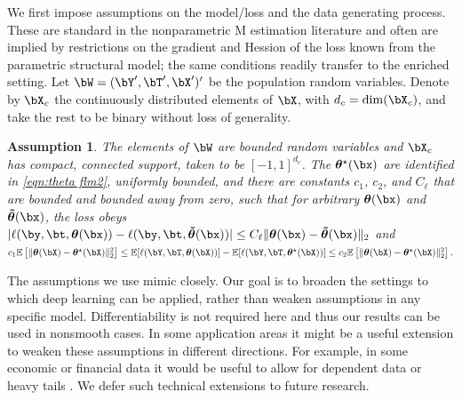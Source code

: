 \documentclass[12pt]{article}
\newtheorem{assumption}{Assumption}
\numberwithin{equation}{section}
\theoremstyle{definition}
\newcommand{\E}{\mathbb{E}}
\newcommand{\btheta}{\boldsymbol{\theta}}
\newcommand{\bttrue}{\btheta^\star}
\newcommand{\dc}{d_c}  %
\begin{document}
We first impose assumptions on the model/loss and the data generating process. These are standard in the nonparametric M estimation literature \cite{Chen2007_handbook} and often are implied by restrictions on the gradient and Hession of the loss known from the parametric structural model; the same conditions readily transfer to the enriched setting. Let $\bW = (\bY',\bT',\bX')'$ be the population random variables. Denote by $\bX_c$ the continuously distributed elements of $\bX$, with $\dc = \dim(\bX_c)$, and take the rest to be binary without loss of generality. 
\begin{assumption}
	\label{asmpt:dgp dnn}
    The elements of $\bW$ are bounded random variables and $\bX_c$ has compact, connected support, taken to be $[-1,1]^{\dc}$. The $\bttrue(\bx)$ are identified in \eqref{eqn:theta flm2}, uniformly bounded, and there are constants $c_1$, $c_2$, and $C_\ell$ that are bounded and bounded away from zero, such that for arbitrary $\btheta(\bx)$ and $\bm{\tilde{\theta}}(\bx)$, the loss obeys $|\ell(\by,\bt,\btheta(\bx) ) - \ell(\by,\bt,\bm{\tilde{\theta}}(\bx))| \leq C_\ell \|\btheta(\bx) - \bm{\tilde{\theta}}(\bx) \|_2$ and 
    $
        c_1 \E \left[ \|\btheta(\bX) - \bttrue (\bX) \|_2^2 \right] \leq \E [\ell(\bY,\bT,\btheta(\bX))] - \E [\ell(\bY,\bT,\bttrue(\bX))] \leq c_2 \E \left[ \|\btheta(\bX) - \bttrue (\bX) \|_2^2 \right].
    $
\end{assumption}
The assumptions we use mimic \cite{Farrell-Liang-Misra2021_Ecma} closely. Our goal is to broaden the settings to which deep learning can be applied, rather than weaken assumptions in any specific model. Differentiability is not required here and thus our results can be used in nonsmooth cases. In some application areas it might be a useful extension to weaken these assumptions in different directions. For example, in some economic or financial data it would be useful to allow for dependent data \cite{Brown2025_WP} or heavy tails \cite{Fan-Gu-Zhou2024_AoS}. We defer such technical extensions to future research.
\end{document}
